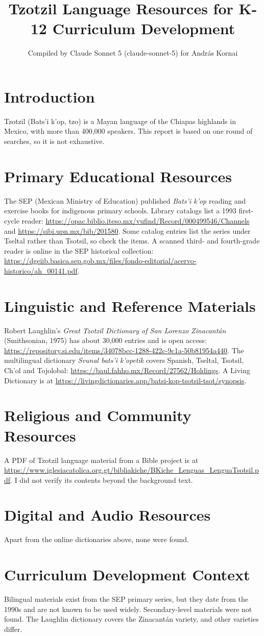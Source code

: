 \documentclass[12pt]{article}
\title{Tzotzil Language Resources for K-12 Curriculum Development}
\author{Compiled by Claude Sonnet 5 (claude-sonnet-5) for Andr\'as Kornai}
\date{}
\begin{document}
\maketitle
\section{Introduction}
Tzotzil (Bats'i k'op, tzo) is a Mayan language of the Chiapas highlands in Mexico, with more than 400,000 speakers. This report is based on one round of searches, so it is not exhaustive.
\section{Primary Educational Resources}
The SEP (Mexican Ministry of Education) published \emph{Bats'i k'op} reading and exercise books for indigenous primary schools. Library catalogs list a 1993 first-cycle reader: \url{https://opac.biblio.iteso.mx/vufind/Record/000499546/Channels} and \url{https://sibi.upn.mx/bib/201580}. Some catalog entries list the series under Tseltal rather than Tsotsil, so check the items. A scanned third- and fourth-grade reader is online in the SEP historical collection: \url{https://dgeiib.basica.sep.gob.mx/files/fondo-editorial/acervo-historico/ah_00141.pdf}.
\section{Linguistic and Reference Materials}
Robert Laughlin's \emph{Great Tzotzil Dictionary of San Lorenzo Zinacant\'an} (Smithsonian, 1975) has about 30,000 entries and is open access: \url{https://repository.si.edu/items/34078bcc-1288-422c-9c1a-50b81954a440}. The multilingual dictionary \emph{Svunal bats'i k'opetik} covers Spanish, Tseltal, Tsotsil, Ch'ol and Tojolobal: \url{https://baul.fahho.mx/Record/27562/Holdings}. A Living Dictionary is at \url{https://livingdictionaries.app/batsi-kop-tsotsil-tsot/synopsis}.
\section{Religious and Community Resources}
A PDF of Tzotzil language material from a Bible project is at \url{https://www.iglesiacatolica.org.gt/bibliakiche/BKiche_Lenguas_LenguaTsotsil.pdf}. I did not verify its contents beyond the background text.
\section{Digital and Audio Resources}
Apart from the online dictionaries above, none were found.
\section{Curriculum Development Context}
Bilingual materials exist from the SEP primary series, but they date from the 1990s and are not known to be used widely. Secondary-level materials were not found. The Laughlin dictionary covers the Zinacant\'an variety, and other varieties differ.
\end{document}
